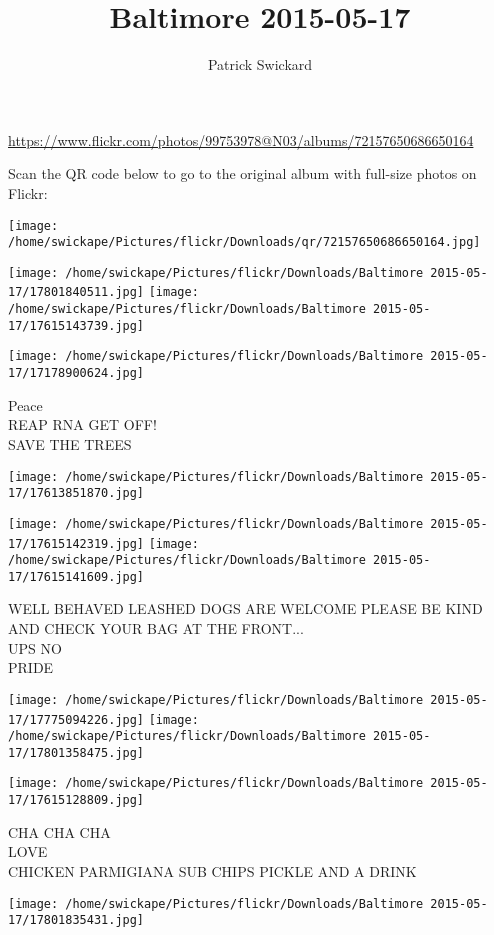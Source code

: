 \documentclass[10pt,letterpaper]{article}
\title{Baltimore 2015-05-17}
\author{Patrick Swickard}
\date{}
\begin{document}
\maketitle

\url{https://www.flickr.com/photos/99753978@N03/albums/72157650686650164}

Scan the QR code below to go to the original album with full-size photos on Flickr:

\texttt{[image: /home/swickape/Pictures/flickr/Downloads/qr/72157650686650164.jpg]}
\pagebreak

\texttt{[image: /home/swickape/Pictures/flickr/Downloads/Baltimore 2015-05-17/17801840511.jpg]}
\texttt{[image: /home/swickape/Pictures/flickr/Downloads/Baltimore 2015-05-17/17615143739.jpg]}

\texttt{[image: /home/swickape/Pictures/flickr/Downloads/Baltimore 2015-05-17/17178900624.jpg]}

Peace\\
REAP RNA GET OFF!\\
SAVE THE TREES
\pagebreak

\texttt{[image: /home/swickape/Pictures/flickr/Downloads/Baltimore 2015-05-17/17613851870.jpg]}

\vspace{0.25in}
\texttt{[image: /home/swickape/Pictures/flickr/Downloads/Baltimore 2015-05-17/17615142319.jpg]}
\texttt{[image: /home/swickape/Pictures/flickr/Downloads/Baltimore 2015-05-17/17615141609.jpg]}

WELL BEHAVED LEASHED DOGS ARE WELCOME PLEASE BE KIND AND CHECK YOUR BAG AT THE FRONT...\\
UPS NO\\
PRIDE
\pagebreak

\texttt{[image: /home/swickape/Pictures/flickr/Downloads/Baltimore 2015-05-17/17775094226.jpg]}
\texttt{[image: /home/swickape/Pictures/flickr/Downloads/Baltimore 2015-05-17/17801358475.jpg]}

\texttt{[image: /home/swickape/Pictures/flickr/Downloads/Baltimore 2015-05-17/17615128809.jpg]}

CHA CHA CHA\\
LOVE\\
CHICKEN PARMIGIANA SUB CHIPS PICKLE AND A DRINK
\pagebreak

\texttt{[image: /home/swickape/Pictures/flickr/Downloads/Baltimore 2015-05-17/17801835431.jpg]}
\end{document}
